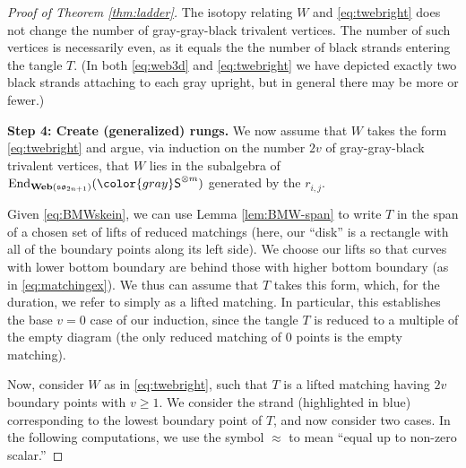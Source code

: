 \documentclass[10pt]{amsart}
\newcommand{\bl}[1]{{\color{blue}#1}}
\newcommand{\gray}[1]{{\color{gray}#1}}
\numberwithin{equation}{section}
\theoremstyle{definition}
\newcommand{\End}{{\rm End}}
\newcommand{\son}[1][2n+1]{\mathfrak{so}_{#1}}
\newcommand{\Web}{\mathbf{Web}}
\newcommand{\gS}{\gray{\mathsf{S}}}
\begin{document}
\begin{proof}[Proof of Theorem \ref{thm:ladder}]
The isotopy relating $W$ and \eqref{eq:twebright} 
does not change the number of gray-gray-black trivalent vertices. 
The number of such vertices is necessarily even, as it equals the 
the number of black strands entering the tangle $T$.
(In both \eqref{eq:web3d} and \eqref{eq:twebright} we have depicted 
exactly two black strands attaching to each gray upright, 
but in general there may be more or fewer.)
\newline

\noindent \textbf{Step 4: Create (generalized) rungs.}
We now assume that $W$ takes the form \eqref{eq:twebright} and argue,
via induction on the number $2v$ of gray-gray-black trivalent vertices, 
that $W$ lies in the subalgebra of $\End_{\Web(\son)}(\gS^{\otimes m})$ generated by the $r_{i,j}$.

Given \eqref{eq:BMWskein}, 
we can use Lemma \ref{lem:BMW-span} to write $T$ in the span of a chosen set of 
lifts of reduced matchings
(here, our ``disk'' is a rectangle with all of the boundary points along its left side).
We choose our lifts so that curves with lower bottom boundary are behind 
those with higher bottom boundary (as in \eqref{eq:matchingex}). 
We thus can assume that $T$ takes this form, which, for the duration, 
we refer to simply as a lifted matching.
In particular, this establishes the base $v=0$ case of our induction, 
since the tangle $T$ is reduced to a multiple of the empty diagram
(the only reduced matching of $0$ points is the empty matching).

Now, consider $W$ as in \eqref{eq:twebright}, 
such that $T$ is a lifted matching having $2v$ boundary points with $v \geq 1$. 
We consider the strand (highlighted in \bl{blue}) 
corresponding to the lowest boundary point of $T$, 
and now consider two cases. 
In the following computations, we use the symbol $\approx$ to mean 
``equal up to non-zero scalar.''


\end{proof}
\end{document}
